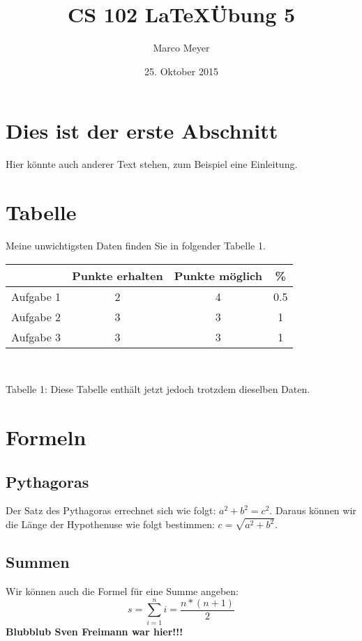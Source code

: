 \documentclass{article}
\author{Marco Meyer}
\title{CS 102 \LaTeX  \"Ubung 5}
\date{25. Oktober 2015}
\begin{document}
\maketitle
\section{Dies ist der erste Abschnitt}
Hier k\"onnte auch anderer Text stehen, zum Beispiel eine Einleitung.

\section{Tabelle}
Meine unwichtigsten Daten finden Sie in folgender Tabelle 1.\\

\begin{tabular}[c]{c|c|c|c}

 & Punkte erhalten & Punkte m\"oglich & \%\\
\hline
Aufgabe 1 & 2 & 4 &0.5 \\
Aufgabe 2 & 3 & 3 &1\\
Aufgabe 3 & 3 & 3 &1 \\

\end{tabular} \\
\begin{center}
Tabelle 1: Diese Tabelle enthält jetzt jedoch trotzdem dieselben Daten.
\end{center} 

\section{Formeln}
\subsection{Pythagoras}
Der Satz des Pythagoras errechnet sich wie folgt: $ a^{2}+b^{2}=c^{2} $. Daraus k\"onnen wir die L\"ange der Hypothenuse wie folgt bestimmen: $ c=\sqrt{a^{2}+b^{2}} $.
\subsection{Summen}
Wir k\"onnen auch die Formel f\"ur eine Summe angeben:\\ 
\begin{equation}
	s=\sum_{i=1}^n i=\frac{n*(n+1)}{2}
	\label{eq:formel}
\end{equation} 
\textbf{Blubblub Sven Freimann war hier!!!}
\end{document}
